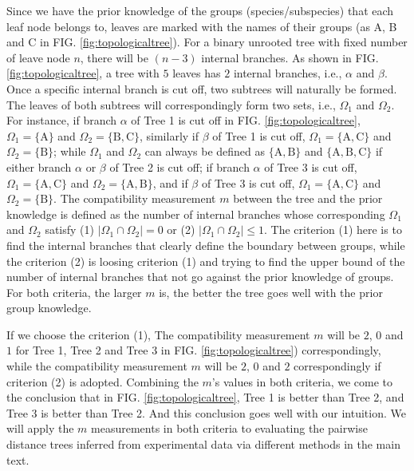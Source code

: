 \documentclass{article}
\begin{document}
Since we have the prior knowledge of the groups (species/subspecies) that each leaf node belongs to, leaves are marked with the names of their groups (as A, B and C in FIG. \ref{fig:topologicaltree}). For a binary unrooted tree with fixed number of leave node $n$, there will be $(n-3)$ internal branches. As shown in FIG. \ref{fig:topologicaltree}, a tree with $5$ leaves has $2$ internal branches, i.e., $\alpha$ and $\beta$.  Once a specific internal branch is cut off, two subtrees will naturally be formed. The leaves of both subtrees will correspondingly form two sets, i.e., $\Omega_1$ and $\Omega_2$. For instance, if branch $\alpha$ of Tree 1 is cut off in FIG. \ref{fig:topologicaltree}, $\Omega_1=\{\mathrm{A}\}$ and $\Omega_2=\{\mathrm{B,C}\}$, similarly if $\beta$ of Tree 1 is cut off, $\Omega_1=\{\mathrm{A,C}\}$ and $\Omega_2=\{\mathrm{B}\}$; while $\Omega_1$ and $\Omega_2$ can always be defined as $\{\mathrm{A,B}\}$ and $\{\mathrm{A,B,C}\}$ if either branch $\alpha$ or $\beta$ of Tree 2 is cut off; if branch $\alpha$ of Tree 3 is cut off, $\Omega_1=\{\mathrm{A,C}\}$ and $\Omega_2=\{\mathrm{A,B}\}$, and if $\beta$ of Tree 3 is cut off, $\Omega_1=\{\mathrm{A,C}\}$ and $\Omega_2=\{\mathrm{B}\}$. The compatibility measurement $m$ between the tree and the prior knowledge is defined as the number of internal branches whose corresponding $\Omega_1$ and $\Omega_2$ satisfy (1) $|\Omega_1 \cap \Omega_2|=0$ or (2) $|\Omega_1 \cap \Omega_2|\leq 1$. The criterion (1) here is to find the internal branches that clearly define the boundary between groups, while the criterion (2) is loosing criterion (1) and trying to find the upper bound of the number of internal branches that not go against the prior knowledge of groups. For both criteria, the larger $m$ is, the better the tree goes well with the prior group knowledge.

If we choose the criterion (1), The compatibility measurement $m$ will be $2$, $0$ and $1$ for Tree 1, Tree 2 and Tree 3 in FIG. \ref{fig:topologicaltree}) correspondingly, while the compatibility measurement $m$ will be $2$, $0$ and $2$ correspondingly if criterion (2) is adopted. Combining the $m$'s values in both criteria, we come to the conclusion that in FIG. \ref{fig:topologicaltree}, Tree 1 is better than Tree 2, and Tree 3 is better than Tree 2. And this conclusion goes well with our intuition. We will apply the $m$ measurements in both criteria to evaluating the pairwise distance trees inferred from experimental data via different methods in the main text.
\end{document}
